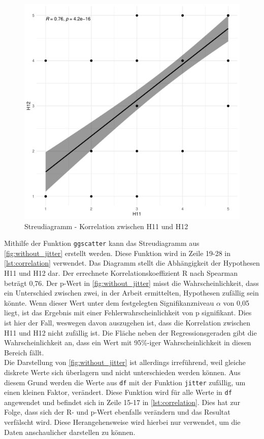 \begin{figure}[H]
\centering
\includegraphics[width=0.65\columnwidth]{figures/plots/without_jitter.pdf}
\caption{\label{fig:without_jitter} Streudiagramm - Korrelation zwischen H11 und H12}
\end{figure}

Mithilfe der Funktion \texttt{ggscatter} kann das Streudiagramm aus \autoref{fig:without_jitter} erstellt werden. Diese Funktion wird in Zeile 19-28 in \autoref{lst:correlation} verwendet. Das Diagramm stellt die Abhängigkeit der Hypothesen H11 und H12 dar. Der errechnete Korrelationskoeffizient R nach Spearman beträgt 0,76. Der p-Wert in \autoref{fig:without_jitter} misst die Wahrscheinlichkeit, dass ein Unterschied zwischen zwei, in der Arbeit ermittelten, Hypothesen zufällig sein könnte. Wenn dieser Wert unter dem festgelegten Signifikanzniveau $\alpha$ von 0,05 liegt, ist das Ergebnis mit einer Fehlerwahrscheinlichkeit von p signifikant\cite[S.350]{elementare-stochastik}. Dies ist hier der Fall, weswegen davon auszugehen ist, dass die Korrelation zwischen H11 und H12 nicht zufällig ist. Die Fläche neben der Regressionsgeraden gibt die Wahrscheinlichkeit an, dass ein Wert mit 95\%-iger Wahrscheinlichkeit in diesen Bereich fällt.\\

Die Darstellung von \autoref{fig:without_jitter} ist allerdings irreführend, weil gleiche diskrete Werte sich überlagern und nicht unterschieden werden können. Aus diesem Grund werden die Werte aus \texttt{df} mit der Funktion \texttt{jitter}\cite{jitter} zufällig, um einen kleinen Faktor, verändert. Diese Funktion wird für alle Werte in \texttt{df} angewendet und befindet sich in Zeile 15-17 in \autoref{lst:correlation}. Dies hat zur Folge, dass sich der R- und p-Wert ebenfalls verändern und das Resultat verfälscht wird. Diese Herangehensweise wird hierbei nur verwendet, um die Daten anschaulicher darstellen zu können.

